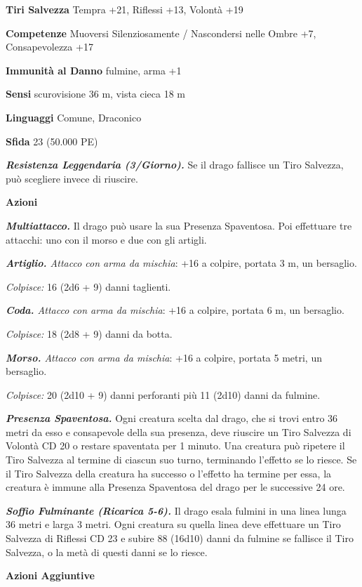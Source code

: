 \begin{multicols}{2}
\textbf{Tiri Salvezza} Tempra +21, Riflessi +13, Volontà +19

\textbf{Competenze} Muoversi Silenziosamente / Nascondersi nelle Ombre +7, Consapevolezza +17

\textbf{Immunità al Danno} fulmine, arma +1

\textbf{Sensi} scurovisione 36 m, vista cieca 18 m

\textbf{Linguaggi} Comune, Draconico

\textbf{Sfida} 23 (50.000 PE)

\emph{\textbf{Resistenza Leggendaria (3/Giorno).}} Se il drago fallisce un Tiro Salvezza, può scegliere invece di riuscire.

\textbf{Azioni}

\emph{\textbf{Multiattacco.}} Il drago può usare la sua Presenza Spaventosa. Poi effettuare tre attacchi: uno con il morso e due con gli artigli.

\emph{\textbf{Artiglio.} Attacco con arma da mischia}: +16 a colpire,
portata 3 m, un bersaglio.

\emph{Colpisce:} 16 (2d6 + 9) danni taglienti.

\emph{\textbf{Coda.} Attacco con arma da mischia}: +16 a colpire, portata 6 m, un bersaglio.

\emph{Colpisce:} 18 (2d8 + 9) danni da botta.

\emph{\textbf{Morso.} Attacco con arma da mischia}: +16 a colpire, portata 5 metri, un bersaglio.

\emph{Colpisce:} 20 (2d10 + 9) danni perforanti più 11 (2d10) danni da fulmine.

\emph{\textbf{Presenza Spaventosa.}} Ogni creatura scelta dal drago, che si trovi entro 36 metri da esso e consapevole della sua presenza, deve riuscire un Tiro Salvezza di Volontà CD 20 o restare spaventata per 1 minuto. Una creatura può ripetere il Tiro Salvezza al termine di ciascun suo turno, terminando l'effetto se lo riesce. Se il Tiro Salvezza della creatura ha successo o l'effetto ha termine per essa, la creatura è immune alla Presenza Spaventosa del drago per le successive 24 ore.

\emph{\textbf{Soffio Fulminante (Ricarica 5-6).}} Il drago esala fulmini in una linea lunga 36 metri e larga 3 metri. Ogni creatura su quella linea deve effettuare un Tiro Salvezza di Riflessi CD 23 e subire 88 (16d10) danni da fulmine se fallisce il Tiro Salvezza, o la metà di questi danni se lo riesce.

\textbf{Azioni Aggiuntive}


\end{multicols}
